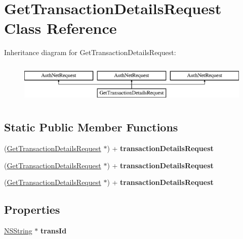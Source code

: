 \hypertarget{interface_get_transaction_details_request}{
\section{GetTransactionDetailsRequest Class Reference}
\label{interface_get_transaction_details_request}
}
Inheritance diagram for GetTransactionDetailsRequest:\begin{figure}[H]
\begin{center}
\leavevmode
\includegraphics[height=1.996435cm]{interface_get_transaction_details_request}
\end{center}
\end{figure}
\subsection*{Static Public Member Functions}
\begin{DoxyCompactItemize}
\item 
\hypertarget{interface_get_transaction_details_request_a8b72a74fd4ab17ed7483a7a4d0f868b1}{
(\hyperlink{interface_get_transaction_details_request}{GetTransactionDetailsRequest} $\ast$) + {\bfseries transactionDetailsRequest}}
\label{interface_get_transaction_details_request_a8b72a74fd4ab17ed7483a7a4d0f868b1}

\item 
\hypertarget{interface_get_transaction_details_request_a8b72a74fd4ab17ed7483a7a4d0f868b1}{
(\hyperlink{interface_get_transaction_details_request}{GetTransactionDetailsRequest} $\ast$) + {\bfseries transactionDetailsRequest}}
\label{interface_get_transaction_details_request_a8b72a74fd4ab17ed7483a7a4d0f868b1}

\item 
\hypertarget{interface_get_transaction_details_request_a8b72a74fd4ab17ed7483a7a4d0f868b1}{
(\hyperlink{interface_get_transaction_details_request}{GetTransactionDetailsRequest} $\ast$) + {\bfseries transactionDetailsRequest}}
\label{interface_get_transaction_details_request_a8b72a74fd4ab17ed7483a7a4d0f868b1}

\end{DoxyCompactItemize}
\subsection*{Properties}
\begin{DoxyCompactItemize}
\item 
\hypertarget{interface_get_transaction_details_request_acb99a2f9cc9dbc79ceba4349a3431ec5}{
\hyperlink{class_n_s_string}{NSString} $\ast$ {\bfseries transId}}
\label{interface_get_transaction_details_request_acb99a2f9cc9dbc79ceba4349a3431ec5}

\end{DoxyCompactItemize}


